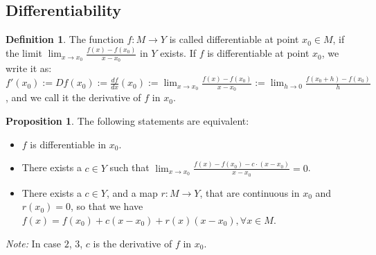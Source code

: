 \documentclass{article}
\theoremstyle{definition}
\newtheorem{defi}{Definition}[subsection]
\newtheorem{prop}{Proposition}[subsection]
\begin{document}
\subsection{Differentiability}
\begin{defi}
The function $f:M\to Y$ is called differentiable at point $x_0\in M$, if the limit $\lim_{x\to x_0}\frac{f(x)-f(x_0)}{x-x_0}$ in $Y$ exists. If $f$ is differentiable at point $x_0$, we write it as: $f'(x_0):=Df(x_0) := \frac{df}{dx}(x_0) := \lim_{x\to x_0}\frac{f(x)-f(x_0)}{x-x_0} := \lim_{h\to 0}\frac{f(x_0+h)-f(x_0)}{h}$, and we call it the derivative of $f$ in $x_0$.
\end{defi}
\begin{prop}
The following statements are equivalent:
\begin{itemize}
    \item $f$ is differentiable in $x_0$.
    \item There exists a $c\in Y$ such that $\lim_{x\to x_0}\frac{f(x)-f(x_0)-c\cdot (x-x_0)}{x-x_0}=0$.
    \item There exists a $c\in Y$, and a map $r: M\to Y$, that are continuous in $x_0$ and $r(x_0)=0$, so that we have $f(x)=f(x_0)+c(x-x_0)+r(x)(x-x_0), \forall x\in M$.
\end{itemize}
\end{prop}
\textit{Note:} In case $2$, $3$, $c$ is the derivative of $f$ in $x_0$.
\end{document}
